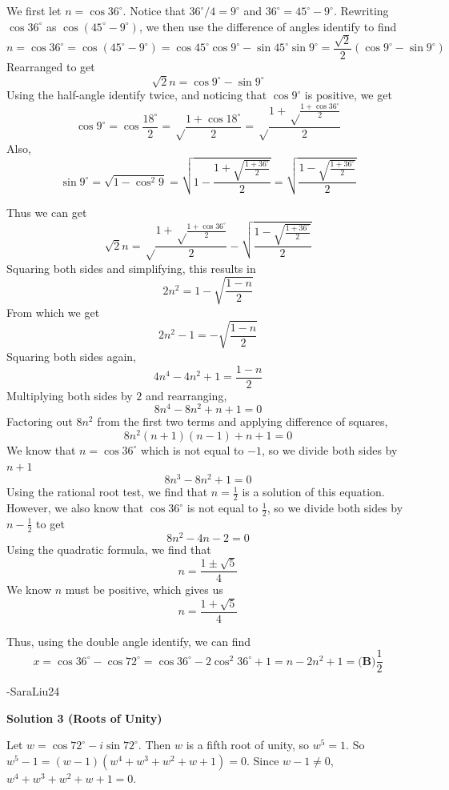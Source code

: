 \begin{enumerate}
 We first let $n = \cos 36^{\circ}$. Notice that $36^{\circ}/4 = 9^{\circ}$ and $36^{\circ} = 45^{\circ} - 9^{\circ}$. Rewriting $\cos 36^{\circ}$ as $\cos (45^{\circ} - 9^{\circ})$, we then use the difference of angles identify to find 
 \[n = \cos 36^{\circ} = \cos (45^{\circ} - 9^{\circ}) = \cos 45^{\circ}\cos 9^{\circ} - \sin 45^{\circ}\sin 9^{\circ} = \frac{\sqrt2}{2}(\cos 9^{\circ} - \sin 9^{\circ})\] Rearranged to get 
 \[\sqrt2 n = \cos 9^{\circ} - \sin 9^{\circ}\]Using the half-angle identify twice, and noticing that $\cos 9^{\circ}$ is positive, we get 
 \[\cos 9^{\circ} = \cos \frac{18^{\circ}}{2} = \sqrt \frac{1 + \cos 18^{\circ}}{2} = \sqrt \frac{1 + \sqrt \frac{1 + \cos 36^{\circ}}{2}}{2}\]Also, 
 \[\sin 9^{\circ} = \sqrt {1 - \cos^2 9} = \sqrt {1 - \frac{1 + \sqrt{\frac{1 + 36^{\circ}}{2}}}{2}} = \sqrt {\frac{1 - \sqrt{\frac{1 + 36^{\circ}}{2}}}{2}}\]

 Thus we can get
 \[\sqrt2 n = \sqrt \frac{1 + \sqrt \frac{1 + \cos 36^{\circ}}{2}}{2} - \sqrt {\frac{1 - \sqrt{\frac{1 + 36^{\circ}}{2}}}{2}}\]Squaring both sides and simplifying, this results in 
 \[2n^2 = 1 - \sqrt{\frac{1-n}{2}}\]From which we get 
 \[2n^2 - 1 = - \sqrt{\frac{1-n}{2}}\]Squaring both sides again, 
 \[4n^4 - 4n^2 +1 = \frac{1-n}{2}\]Multiplying both sides by $2$ and rearranging, 
 \[8n^4 - 8n^2 + n + 1 = 0\]Factoring out $8n^2$ from the first two terms and applying difference of squares, 
 \[8n^2(n+1)(n-1) + n+1 = 0\] We know that $n = \cos 36^{\circ}$ which is not equal to $-1$, so we divide both sides by $n+1$ 
 \[8n^3 -8n^2 +1 = 0\]Using the rational root test, we find that $n = \frac{1}{2}$ is a solution of this equation. However, we also know that $\cos 36^{\circ}$ is not equal to $\frac{1}{2}$, so we divide both sides by $n- \frac{1}{2}$ to get 
 \[8n^2 - 4n - 2 = 0\] Using the quadratic formula, we find that 
 \[n = \frac{1 \pm \sqrt{5}}{4}\] We know $n$ must be positive, which gives us 
 \[n = \frac{1 + \sqrt{5}}{4}\]

 Thus, using the double angle identify, we can find 
 \[x = \cos 36^{\circ} - \cos 72^{\circ} = \cos 36^{\circ} - 2\cos^2 36^{\circ} + 1 = n - 2n^2 + 1 = \boxed{\textbf{(B)} \frac{1}{2}}\]

 -SaraLiu24

 



\textbf{Solution 3 (Roots of Unity)}

Let $w = \cos 72^\circ - i \sin 72^\circ$.  Then $w$ is a fifth root of unity, so $w^5 = 1$.  So $w^5-1 = (w-1)(w^4 + w^3 + w^2 + w + 1) = 0$.  Since $w - 1 \neq 0$, $w^4 + w^3 + w^2 + w + 1 = 0$.


\end{enumerate}
